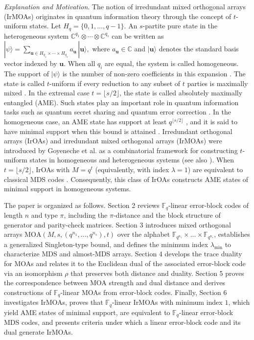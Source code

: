 \documentclass[11pt]{article}
\newtheorem{Definition and Notation}[Theorem]{Definition and Notation}
\begin{document}
\begin{itemize}
{\it Explanation and Motivation}. The notion of irredundant mixed orthogonal arrays (IrMOAs) originates in quantum information theory through the concept of $t$-uniform states. Let $H_q=\{0,1,\ldots,q-1\}$. An $s$-partite pure state in the heterogeneous system $\mathbb{C}^{q_1}\otimes\cdots\otimes\mathbb{C}^{q_s}$ can be written as $|\psi\rangle=\sum_{\mathbf{u}\in H_{q_1}\times\cdots\times H_{q_s}} a_{\mathbf{u}}\,|\mathbf{u}\rangle,$
where $a_{\mathbf{u}}\in\mathbb{C}$ and $|\mathbf{u}\rangle$ denotes the standard basis vector indexed by $\mathbf{u}$. 
When all $q_i$ are equal, the system is called homogeneous. The support of $|\psi\rangle$ is the number of non-zero coefficients in this expansion \cite{GALRZ2015}. 
The state is called $t$-uniform if every reduction to any subset of $t$ parties is maximally mixed \cite{GZ2014,S2004}. 
In the extremal case $t=\lfloor s/2\rfloor$, the state is called absolutely maximally entangled (AME). 
Such states play an important role in quantum information tasks such as quantum secret sharing and quantum error correction \cite{GALRZ2015,HGS2017,AlsinaRazavi2021,SSCZ2022}. 
In the homogeneous case, an AME state has support at least $q^{\lfloor s/2\rfloor}$ \cite[Proposition~1]{B2019}, and it is said to have minimal support when this bound is attained \cite{GALRZ2015}. Irredundant orthogonal arrays (IrOAs) and irredundant mixed orthogonal arrays (IrMOAs) were introduced by Goyeneche et al. \cite{GBZ2016, GZ2014} as a combinatorial framework for constructing $t$-uniform states in homogeneous and heterogeneous systems (see also \cite{Bajalan_2025,GALRZ2015,HGS2017,LiWang2019,SSCZ2022,ShenChen2021,ShiNingZhaoZhang2024,FJXY2023,ChenJiLei,PangZhangFeiZheng2021}). 
When $t=\lfloor s/2\rfloor$, IrOAs with $M=q^t$ (equivalently, with index $\lambda=1$) are equivalent to classical MDS codes \cite{B2019,GALRZ2015}. Consequently, this class of IrOAs constructs AME states of minimal support in homogeneous systems. 
\end{itemize}


The paper is organized as follows. Section 2 reviews $\mathbb{F}_q$-linear error-block codes of length $n$ and type $\pi$, including the $\pi$-distance and the block structure of generator and parity-check matrices. Section 3 introduces mixed orthogonal arrays $\mathrm{MOA}(M, s, (q^{n_1}, \dots, q^{n_s}), t)$ over the alphabet $\mathbb{F}_{q^{n_1}} \times \dots \times \mathbb{F}_{q^{n_s}}$, establishes a generalized Singleton-type bound, and defines the minimum index $\lambda_{\min}$ to characterize MDS and almost-MDS arrays. Section 4 develops the trace duality for MOAs and relates it to the Euclidean dual of the associated error-block code via an isomorphism $\rho$ that preserves both distance and duality. Section 5 proves the correspondence between MOA strength and dual distance and derives constructions of $\mathbb{F}_q$-linear MOAs from error-block codes. Finally, Section 6 investigates IrMOAs, proves that $\mathbb{F}_q$-linear IrMOAs with minimum index $1$, which yield AME states of minimal support, are equivalent to $\mathbb{F}_q$-linear error-block MDS codes, and presents criteria under which a linear error-block code and its dual generate IrMOAs.
\end{document}
